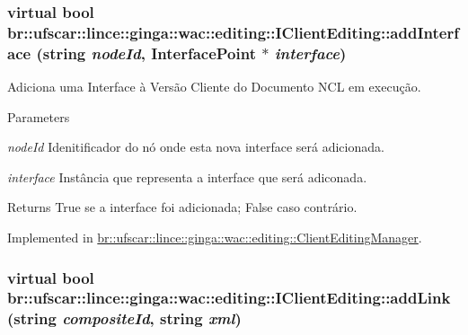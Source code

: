 \hypertarget{classbr_1_1ufscar_1_1lince_1_1ginga_1_1wac_1_1editing_1_1IClientEditing_a7a733528927ed22d232ae58e0539b1eb}{
\subsubsection[{addInterface}]{\setlength{\rightskip}{0pt plus 5cm}virtual bool br::ufscar::lince::ginga::wac::editing::IClientEditing::addInterface (string {\em nodeId}, \/  InterfacePoint $\ast$ {\em interface})}}
\label{classbr_1_1ufscar_1_1lince_1_1ginga_1_1wac_1_1editing_1_1IClientEditing_a7a733528927ed22d232ae58e0539b1eb}


Adiciona uma Interface à Versão Cliente do Documento NCL em execução. 


\begin{DoxyParams}{Parameters}
\item[{\em nodeId}]Idenitificador do nó onde esta nova interface será adicionada. \item[{\em interface}]Instância que representa a interface que será adiconada. \end{DoxyParams}
\begin{DoxyReturn}{Returns}
True se a interface foi adicionada; False caso contrário. 
\end{DoxyReturn}


Implemented in \hyperlink{classbr_1_1ufscar_1_1lince_1_1ginga_1_1wac_1_1editing_1_1ClientEditingManager_a7e6eaecc65141d2660bdb1b1c33c421f}{br::ufscar::lince::ginga::wac::editing::ClientEditingManager}.

\hypertarget{classbr_1_1ufscar_1_1lince_1_1ginga_1_1wac_1_1editing_1_1IClientEditing_aa9d2c5d6522cc5428abc2a3231299b74}{
\subsubsection[{addLink}]{\setlength{\rightskip}{0pt plus 5cm}virtual bool br::ufscar::lince::ginga::wac::editing::IClientEditing::addLink (string {\em compositeId}, \/  string {\em xml})}}
\label{classbr_1_1ufscar_1_1lince_1_1ginga_1_1wac_1_1editing_1_1IClientEditing_aa9d2c5d6522cc5428abc2a3231299b74}


